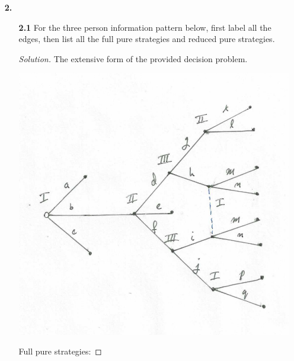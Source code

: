 \documentclass[ 12pt ]{article}
\begin{document}
\begin{enumerate}
\begin{enumerate}
\begin{enumerate}
					\item[\textbf{1.4b.}] Suppose the Society has $n \geq 4$ members. Find a formula for the number of terminal nodes. \\
						\begin{proof}[Solution]
							Suppose the Society has $n \geq 4$ members (excluding the President). We can see that therre are three positions to be filled that dictate the extensive form
							of the decision problem. Thus the number of terminal nodes is $n$ permute 3 or $n(n-1)(n-2)$.
						\end{proof}
						
				\end{enumerate}
		\end{enumerate}


	\item[\textbf{2.}]
		\begin{enumerate}
			\item[\textbf{2.1}] For the three person information pattern below, first label all the edges, then list all the full pure strategies and reduced pure strategies.
				\begin{proof}[Solution]
					The extensive form of the provided decision problem.
					\begin{center}
						\includegraphics{tree9}
					\end{center}
					Full pure strategies:

\end{proof}
\end{enumerate}
\end{enumerate}
\end{document}
